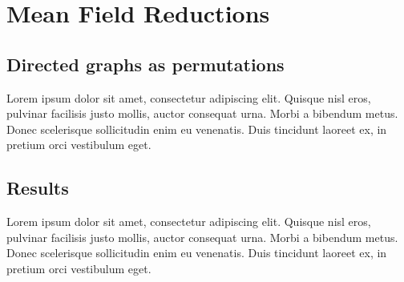 \newpage
\section{Mean Field Reductions}
\subsection{Directed graphs as permutations}
Lorem ipsum dolor sit amet, consectetur adipiscing elit. Quisque nisl eros, 
pulvinar facilisis justo mollis, auctor consequat urna. Morbi a bibendum metus. 
Donec scelerisque sollicitudin enim eu venenatis. Duis tincidunt laoreet ex, 
in pretium orci vestibulum eget.

\subsection{Results}
Lorem ipsum dolor sit amet, consectetur adipiscing elit. Quisque nisl eros, 
pulvinar facilisis justo mollis, auctor consequat urna. Morbi a bibendum metus. 
Donec scelerisque sollicitudin enim eu venenatis. Duis tincidunt laoreet ex, 
in pretium orci vestibulum eget.
